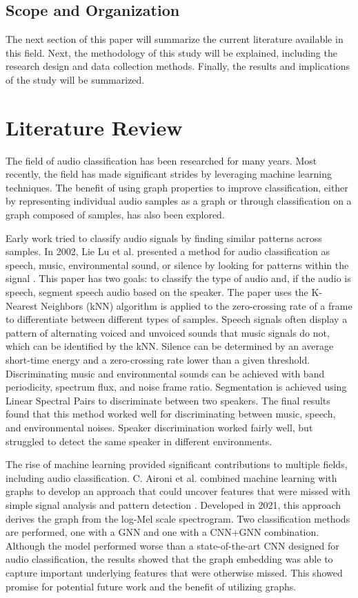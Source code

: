 \documentclass{article}
\begin{document}
\subsection{Scope and Organization}
The next section of this paper will summarize the current literature available in this field. Next, the methodology of this study will be explained, including the research design and data collection methods. Finally, the results and implications of the study will be summarized. 

\section{Literature Review}
  The field of audio classification has been researched for many years. Most recently, the field has made significant strides by leveraging machine learning techniques. The benefit of using graph properties to improve classification, either by representing individual audio samples as a graph or through classification on a graph composed of samples, has also been explored.

Early work tried to classify audio signals by finding similar patterns across samples. 
In 2002, Lie Lu et al. presented a method for audio classification as speech, 
music, environmental sound, or silence by looking for patterns within the signal \cite{lu}.
This paper has two goals: to classify the type of audio and, if the audio is speech,
segment speech audio based on the speaker. The paper uses the K-Nearest Neighbors (kNN) 
algorithm is applied to the zero-crossing rate of a frame to differentiate between different 
types of samples. Speech signals often display a pattern of alternating voiced and unvoiced 
sounds that music signals do not, which can be identified by the kNN. Silence can be determined 
by an average short-time energy and a zero-crossing rate lower than a given threshold. 
Discriminating music and environmental sounds can be achieved with band periodicity, spectrum 
flux, and noise frame ratio. Segmentation is achieved using Linear Spectral Pairs to 
discriminate between two speakers. The final results found that this method worked well for 
discriminating between music, speech, and environmental noises. Speaker discrimination worked 
fairly well, but struggled to detect the same speaker in different environments.

 The rise of machine learning provided significant contributions to multiple fields, including audio classification. C. Aironi et al. combined machine learning with graphs to develop an approach that could uncover features that were missed with simple signal analysis and pattern detection \cite{Aironi}. Developed in 2021, this approach derives the graph from the log-Mel scale spectrogram. Two classification methods are performed, one with a GNN and one with a CNN+GNN combination. Although the model performed worse than a state-of-the-art CNN designed for audio classification, the results showed that the graph embedding was able to capture important underlying features that were otherwise missed. This showed promise for potential future work and the benefit of utilizing graphs.
\end{document}
